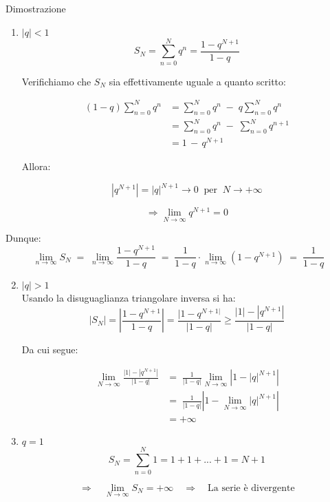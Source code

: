 \documentclass[x11names]{article}
\begin{document}
	\begin{es}{Dimostrazione}
		\begin{enumerate}
			\item $|q| < 1$\\
			\[ 
			S_N = \sum_{n=0}^{N} q^n = \frac{1-q^{N+1}}{1-q}
			\]
			
			Verifichiamo che $S_N$ sia effettivamente uguale a quanto scritto:
			
			\begin{align*}
				(1-q)\sum_{n=0}^{N} q^n &= \sum_{n=0}^{N} q^n \;-\; q\sum_{n=0}^{N} q^n \\
				&= \sum_{n=0}^{N} q^n \;-\; \sum_{n=0}^{N} q^{n+1} \\ 
				&= 1 \,-\, q^{N+1}
			\end{align*}
			
			Allora: 
			
			\[ 
			|q^{N+1}| = |q|^{N+1} \to 0 \;\; \text{per} \;\; N \to +\infty
			\]
			
			\[
			\Longrightarrow \lim_{N\to \infty} q^{N+1} = 0
			\]
			\end{enumerate}
			\end{es}
			\begin{es}{}
			Dunque: 
			\[
			\lim_{n\to \infty} S_N \;= \;\lim_{n\to \infty} \frac{1-q^{N+1}}{1-q} \;=\; \frac{1}{1-q}\cdot \lim_{n\to \infty} (1-q^{N+1}) \;=\; \frac{1}{1-q}
			\]
			\begin{enumerate}
				\setcounter{enumi}{1}
			\item $|q| > 1$\\
			
			Usando la disuguaglianza triangolare inversa si ha: 
			\[
			|S_N| = \left|\frac{1-q^{N+1}}{1-q}\right| = \frac{|1-q^{N+1|}}{|1-q|} \geq 
			\frac{|1|-|q^{N+1}|}{|1-q|}
			\]
			
			Da cui segue: 
			
			\begin{align*}
				\lim_{N\to \infty} \frac{|1|-|q^{N+1}|}{|1-q|} &=\; \frac{1}{|1-q|} \lim_{N\to \infty} \left|1-|q|^{N+1}\right| \\
				&=\; \frac{1}{|1-q|} \left| 1 - \lim_{N\to \infty}|q|^{N+1}\right| \\ 
				&= +\infty
			\end{align*}
			
			\item $q = 1$
			\[
			S_N = \sum_{n=0}^{N} 1 = 1 + 1 + ... + 1 = N + 1
			\]
			
			\[
			\Longrightarrow \quad \lim_{N \to \infty} S_N = +\infty \quad \Longrightarrow \quad\text{La serie è divergente}
			\]
			
		\end{enumerate}
		
	\end{es}
	
\end{document}
